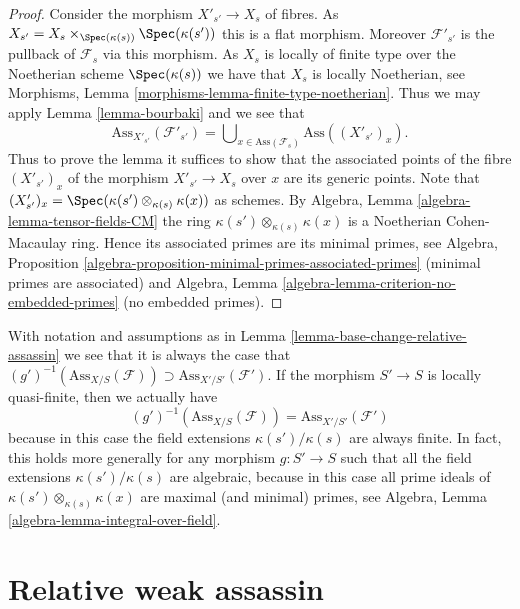 \begin{proof}
Consider the morphism $X'_{s'} \to X_s$ of fibres. As
$X_{s'} = X_s \times_{\Spec(\kappa(s))} \Spec(\kappa(s'))$
this is a flat morphism. Moreover $\mathcal{F}'_{s'}$ is the pullback
of $\mathcal{F}_s$ via this morphism. As $X_s$ is locally of finite
type over the Noetherian scheme $\Spec(\kappa(s))$ we have that
$X_s$ is locally Noetherian, see
Morphisms, Lemma \ref{morphisms-lemma-finite-type-noetherian}.
Thus we may apply
Lemma \ref{lemma-bourbaki}
and we see that
$$
\text{Ass}_{X'_{s'}}(\mathcal{F}'_{s'}) =
\bigcup\nolimits_{x \in \text{Ass}(\mathcal{F}_s)} \text{Ass}((X'_{s'})_x).
$$
Thus to prove the lemma it suffices to show that the associated points
of the fibre $(X'_{s'})_x$ of the morphism $X'_{s'} \to X_s$ over $x$
are its generic points. Note that
$(X'_{s'})_x = \Spec(\kappa(s') \otimes_{\kappa(s)} \kappa(x))$
as schemes. By
Algebra, Lemma \ref{algebra-lemma-tensor-fields-CM}
the ring $\kappa(s') \otimes_{\kappa(s)} \kappa(x)$ is a Noetherian
Cohen-Macaulay ring. Hence its associated primes are its minimal primes, see
Algebra, Proposition \ref{algebra-proposition-minimal-primes-associated-primes}
(minimal primes are associated) and
Algebra, Lemma \ref{algebra-lemma-criterion-no-embedded-primes}
(no embedded primes).
\end{proof}

\begin{remark}
\label{remark-base-change-relative-assassin}
With notation and assumptions as in
Lemma \ref{lemma-base-change-relative-assassin}
we see that it is always the case that
$(g')^{-1}(\text{Ass}_{X/S}(\mathcal{F})) \supset
\text{Ass}_{X'/S'}(\mathcal{F}')$.
If the morphism $S' \to S$ is locally quasi-finite, then we actually have
$$
(g')^{-1}(\text{Ass}_{X/S}(\mathcal{F}))
=
\text{Ass}_{X'/S'}(\mathcal{F}')
$$
because in this case the field extensions $\kappa(s')/\kappa(s)$
are always finite. In fact, this holds more generally for any morphism
$g : S' \to S$ such that all the field extensions
$\kappa(s')/\kappa(s)$ are algebraic, because in this case all
prime ideals of $\kappa(s') \otimes_{\kappa(s)} \kappa(x)$ are
maximal (and minimal) primes, see
Algebra, Lemma \ref{algebra-lemma-integral-over-field}.
\end{remark}




\section{Relative weak assassin}
\label{section-relative-weak-assassin}

